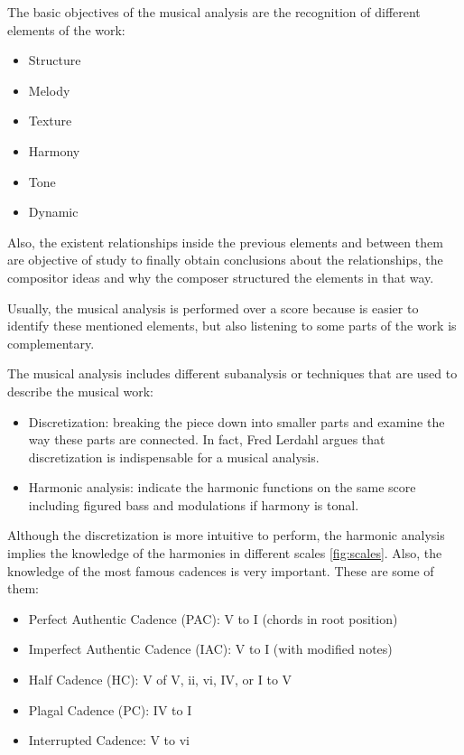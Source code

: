 \documentclass[a4paper,openany,oneside,12pt]{book}
\begin{document}
The basic objectives of the musical analysis are the recognition of different elements of the work:

\begin{itemize}
\item Structure
\item Melody
\item Texture
\item Harmony
\item Tone
\item Dynamic
\end{itemize}

Also, the existent relationships inside the previous elements and between them are objective of study to finally obtain conclusions about the relationships, the compositor ideas and why the composer structured the elements in that way.

Usually, the musical analysis is performed over a score because is easier to identify these mentioned elements, but also listening to some parts of the work is complementary.

The musical analysis includes different subanalysis or techniques that are used to describe the musical work:

\begin{itemize}
\item Discretization: breaking the piece down into smaller parts and examine the way these parts are connected. In fact, Fred Lerdahl\cite{Lerdahl} argues that discretization is indispensable for a musical analysis.
\item Harmonic analysis: indicate the harmonic functions on the same score including figured bass and modulations if harmony is tonal.
\end{itemize}

Although the discretization is more intuitive to perform, the harmonic analysis implies the knowledge of the harmonies in different scales \ref{fig:scales}. Also, the knowledge of the most famous cadences is very important. These are some of them:

\begin{itemize}
\item Perfect Authentic Cadence (PAC): V to I (chords in root position)
\item Imperfect Authentic Cadence (IAC): V to I (with modified notes)
\item Half Cadence (HC): V of V, ii, vi, IV, or I to V
\item Plagal Cadence (PC): IV to I
\item Interrupted Cadence: V to vi
\end{itemize}
\end{document}
